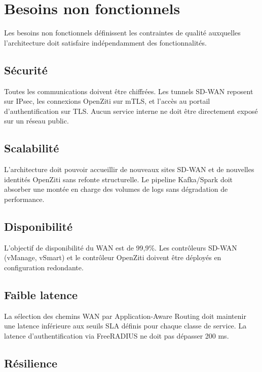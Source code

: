 \documentclass[12pt,a4paper,oneside]{report}
\begin{document}
	\section{Besoins non fonctionnels}
	
	Les besoins non fonctionnels définissent les contraintes de qualité auxquelles
	l'architecture doit satisfaire indépendamment des fonctionnalités.
	
	\subsection{Sécurité}
	
	Toutes les communications doivent être chiffrées. Les tunnels SD-WAN reposent
	sur IPsec, les connexions OpenZiti sur mTLS, et l'accès au portail
	d'authentification sur TLS. Aucun service interne ne doit être directement
	exposé sur un réseau public.
	
	\subsection{Scalabilité}
	
	L'architecture doit pouvoir accueillir de nouveaux sites SD-WAN et de nouvelles
	identités OpenZiti sans refonte structurelle. Le pipeline Kafka/Spark doit
	absorber une montée en charge des volumes de logs sans dégradation de performance.
	
	\subsection{Disponibilité}
	
	L'objectif de disponibilité du WAN est de 99,9\%. Les contrôleurs SD-WAN
	(vManage, vSmart) et le contrôleur OpenZiti doivent être déployés en
	configuration redondante.
	
	\subsection{Faible latence}
	
	La sélection des chemins WAN par Application-Aware Routing doit maintenir
	une latence inférieure aux seuils SLA définis pour chaque classe de service.
	La latence d'authentification via FreeRADIUS ne doit pas dépasser 200 ms.
	
	\subsection{Résilience}
	
\end{document}
